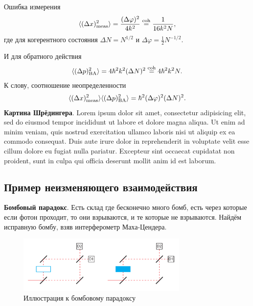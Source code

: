 Ошибка измерения
\begin{equation*}
	\langle (\Delta x)^2_{\textnormal{meas}} \rangle = \frac{(\Delta \varphi)^2}{4 k^2} \overset{\mathrm{coh}}{=} \frac{1}{16 k^2 N},
\end{equation*}
где для когерентного состояния $\Delta N = N^{1/2}$ и $\Delta \varphi = \frac{1}{2} N^{-1/2}$.

И для обратного действия
\begin{equation*}
	\langle (\Delta p)^2_{\textnormal{BA}} \rangle = 4 \hbar^2 k^2 (\Delta N)^2 \overset{\mathrm{coh}}{=}  4 \hbar^2 k^2 N. 
\end{equation*}
К слову, соотношение неопределенности
\begin{equation*}
	\langle (\Delta x)^2_{\textnormal{meas}} \rangle 
	\langle (\Delta p)^2_{\textnormal{BA}} \rangle 
	= 
	\hbar^2 (\Delta \varphi)^2 (\Delta N)^2.
\end{equation*}
\textbf{Картина Шрёдингера}. Lorem ipsum dolor sit amet, consectetur adipisicing elit, sed do eiusmod tempor incididunt ut labore et dolore magna aliqua. Ut enim ad minim veniam, quis nostrud exercitation ullamco laboris nisi ut aliquip ex ea commodo consequat. Duis aute irure dolor in reprehenderit in voluptate velit esse cillum dolore eu fugiat nulla pariatur. Excepteur sint occaecat cupidatat non proident, sunt in culpa qui officia deserunt mollit anim id est laborum.




\subsection*{Пример неизменяющего взаимодействия}

\textbf{Бомбовый парадокс}. Есть склад где бесконечно много бомб, есть через которые если фотон проходит, то они взрываются, и те которые не взрываются. Найдём исправную бомбу, взяв интерферометр Маха-Цендера. 

\begin{figure}[h]
    \centering
    \includegraphics[width=0.75\textwidth]{figures/1.pdf}
    \caption{Иллюстрация к бомбовому парадоксу}
\end{figure}

